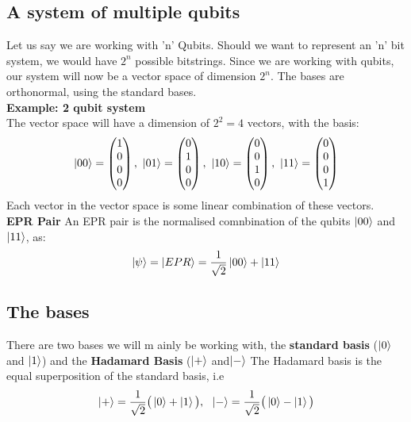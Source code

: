 \documentclass{scrartcl}
\begin{document}
		\subsection{A system of multiple qubits}

Let us say we are working with 'n' Qubits. Should we want to represent an 'n' bit system, we would have $2^n$ possible bitstrings. Since we are working with qubits, our system will now be a vector space of dimension $2^n$. The bases are orthonormal, using the standard bases. 
\\
\textbf{Example: 2 qubit system}
\\
The vector space will have a dimension of $2^2=4$ vectors, with the basis:
\begin{equation} \ket{00}= \begin{pmatrix} 1\\0\\0\\0 \end{pmatrix}, \ \ket{01}= \begin{pmatrix} 0\\1\\0\\0 \end{pmatrix}, \ \ket{10}= \begin{pmatrix} 0\\0\\1\\0 \end{pmatrix}, \ \ket{11}=\begin{pmatrix} 0\\0\\0\\1 \end{pmatrix} \end{equation}
	Each vector in the vector space is some linear combination of these vectors. 
\\
\textbf{EPR Pair}
An EPR pair is the normalised comnbination of the qubits $ \ket{00}$ and $\ket{11}$, as:
\begin{equation} \ket{\psi}=\ket{EPR}=\frac{1}{\sqrt{2}} \ket{00} + \ket{11} \end{equation}
	\subsection{The bases}
There are two bases we will m ainly be working with, the \textbf{standard basis} ($\ket{0}$ and $\ket{1}$) and the \textbf{Hadamard Basis} ($\ket{+} $ and$ \ket{-}$
The Hadamard basis is the equal superposition of the standard basis, i.e 
\begin{equation}
	\ket{+}=\frac{1}{\sqrt{2}} \big( \ket{0}+\ket{1} \big), \ \ \ket{-}=\frac{1}{\sqrt{2}} \big( \ket{0}- \ket{1} \big) 
\end{equation}
\end{document}
